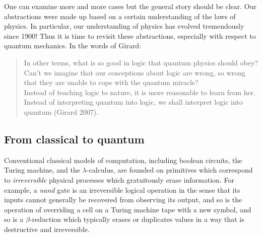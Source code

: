 \documentclass{article}
\newcommand{\jc}[1]{\fbox{Jacques says:} \textbf{#1}}
\begin{document}
One can examine more and more cases but the general story should be
clear. Our abstractions were made up based on a certain understanding of the
laws of physics. In particular, our understanding of physics has evolved
tremendously since 1900!  Thus it is time to revisit these abstractions,
especially with respect to quantum mechanics.
In the words of Girard:
\begin{quote}
  In other terms, what is so good in logic that quantum physics should obey?
  Can't we imagine that our conceptions about logic are wrong, so wrong that
  they are unable to cope with the quantum miracle?
  \\
  Instead of teaching logic to nature, it is more reasonable to learn
  from her. Instead of interpreting quantum into logic, we shall
  interpret logic into quantum (Girard 2007).
\end{quote}

\begin{comment}
\jc{The reason I commented this out is that it is under-justified. The
reader will simply not understand what these next few lines are really
saying.}
Indeed one should take the physical principles underlying quantum mechanics,
the most successful physical theory known to us and adapt computation to
``learn'' from these principles. To illustrate the depth of our crisis, Scott
Aaronson, Umesh Vazirani, and others have proposed the following puzzle.

One of these wild claims must be true!:
\begin{itemize}
\item the extended Church-Turing thesis is false, or
\item quantum physics is false, or
\item there is an efficient classical algorithm for factoring
\end{itemize}
Indeed, if quantum physics is correct then there is an efficient quantum
algorithm for factoring (Shor). If there is no efficient classical algorithm
for factoring then the extended Church-Turing thesis is false.
\end{comment}

\subsection{From classical to quantum}

Conventional classical models of computation, including boolean
circuits, the Turing machine, and the $\lambda$-calculus, are founded on
primitives which correspond to \emph{irreversible} physical processes which
gratuitously erase information.  For example, a \emph{nand} gate is an
irreversible logical operation in the sense that its inputs cannot generally
be recovered from observing its output, and so is the operation of overriding
a cell on a Turing machine tape with a new symbol, and so is a
$\beta$-reduction which typically erases or duplicates values in a way that
is destructive and irreversible.
\end{document}
